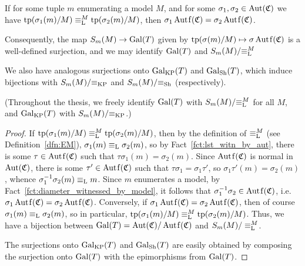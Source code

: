 	
	\begin{fct}
		\label{fct:sm_to_gal}
		If for some tuple $m$ enumerating a model $M$, and for some $\sigma_1,\sigma_2\in \operatorname{{Aut}}({\mathfrak C})$ we have $\operatorname{{tp}}(\sigma_1(m)/M)\equiv_{\mathrm{L}}^M\operatorname{{tp}}(\sigma_2(m)/M)$, then $\sigma_1\Autf(\fC)=\sigma_2\Autf(\fC)$.
		
		Consequently, the map $S_m(M)\to \operatorname{{Gal}}(T)$ given by $\tp(\sigma(m)/M)\mapsto \sigma\Autf(\fC)$ is a well-defined surjection, and we may identify $\operatorname{{Gal}}(T)$ and $S_m(M)/{\equiv_{\mathrm{L}}^M}$
		
		We also have analogous surjections onto $\operatorname{{Gal}}_{\mathrm{KP}}(T)$ and $\operatorname{{Gal}}_{\mathrm{Sh}}(T)$, which induce bijections with $S_m(M)/{\equiv_{\mathrm{KP}}}$ and $S_m(M)/{\equiv_{\mathrm{Sh}}}$ (respectively).
		
		(Throughout the thesis, we freely identify $\operatorname{{Gal}}(T)$ with $S_m(M)/{\equiv_{\mathrm{L}}^M}$ for all $M$, and $\operatorname{{Gal}}_{\mathrm{KP}}(T)$ with $S_m(M)/{\equiv_{\mathrm{KP}}}$.)
	\end{fct}
	\begin{proof}
		If $\operatorname{{tp}}(\sigma_1(m)/M)\equiv_{\mathrm{L}}^M\operatorname{{tp}}(\sigma_2(m)/M)$, then by the definition of $\equiv_{\mathrm{L}}^M$ (see Definition~\ref{dfn:EM}), $\sigma_1(m)\equiv_{\mathrm{L}} \sigma_2(m)$, so by Fact~\ref{fct:lst_witn_by_aut}, there is some $\tau\in \Autf(\fC)$ such that $\tau\sigma_1(m)=\sigma_2(m)$. Since $\Autf(\fC)$ is normal in $\operatorname{{Aut}}({\mathfrak C})$, there is some $\tau'\in \Autf(\fC)$ such that $\tau\sigma_1=\sigma_1\tau'$, so $\sigma_1\tau'(m)=\sigma_2(m)$, whence $\sigma_1^{-1}\sigma_2(m)\equiv_{\mathrm{L}} m$. Since $m$ enumerates a model, by Fact~\ref{fct:diameter_witnessed_by_model}, it follows that $\sigma_1^{-1}\sigma_2\in \Autf(\fC)$, i.e.\ $\sigma_1\Autf(\fC)=\sigma_2\Autf(\fC)$.  Conversely, if $\sigma_1\Autf(\fC)=\sigma_2\Autf(\fC)$, then of course $\sigma_1(m)\equiv_{\mathrm{L}}\sigma_2(m)$, so in particular, $\operatorname{{tp}}(\sigma_1(m)/M)\equiv_{\mathrm{L}}^M\operatorname{{tp}}(\sigma_2(m)/M)$. Thus, we have a bijection between $\Gal(T)=\Aut(\fC)/\Autf(\fC)$ and $S_m(M)/\equiv_{\mathrm{L}}^M$.
		
		The surjections onto $\operatorname{{Gal}}_{\mathrm{KP}}(T)$ and $\operatorname{{Gal}}_{\mathrm{Sh}}(T)$ are easily obtained by composing the surjection onto $\operatorname{{Gal}}(T)$ with the epimorphisms from $\operatorname{{Gal}}(T)$.
	\end{proof}
	

